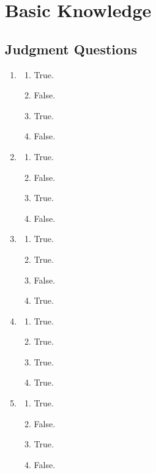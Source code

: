\documentclass[12pt,a4paper]{article}
\begin{document}
\maketitle

\section{Basic Knowledge}
\subsection{Judgment Questions}
\begin{enumerate}
  \item \begin{enumerate}[label=(\Alph*)]
    \item True.
    \item False.
    \item True.
    \item False.
  \end{enumerate}
  \item \begin{enumerate}[label=(\Alph*)]
    \item True.
    \item False.
    \item True.
    \item False.
  \end{enumerate}
  \item \begin{enumerate}[label=(\Alph*)]
    \item True.
    \item True.
    \item False.
    \item True.
  \end{enumerate}
  \item \begin{enumerate}[label=(\Alph*)]
    \item True.
    \item True.
    \item True.
    \item True.
  \end{enumerate}
  \item \begin{enumerate}[label=(\Alph*)]
    \item True.
    \item False.
    \item True.
    \item False.

\end{enumerate}
\end{enumerate}
\end{document}
